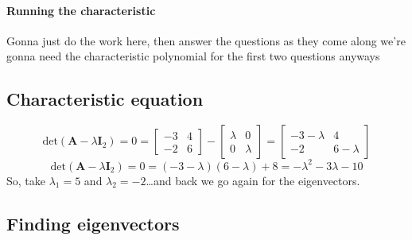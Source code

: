 \documentclass{article}
\begin{document}
        \paragraph{Running the characteristic}
            Gonna just do the work here, then answer the questions as they come along
            we're gonna need the characteristic polynomial for the first two questions anyways
        \subsection{Characteristic equation}
            \[
                \text{det}(\mathbf{A}-\lambda\mathbf{I}_2)=0
                =
                \begin{bmatrix}-3 & 4\\-2 & 6\end{bmatrix}
                -
                \begin{bmatrix}\lambda & 0\\0 & \lambda\end{bmatrix}
                =
                \begin{bmatrix}-3-\lambda & 4\\-2 & 6-\lambda\end{bmatrix}
            \]
            \[
                \text{det}(\mathbf{A}-\lambda\mathbf{I}_2)=0
                =
                (-3-\lambda)(6-\lambda)+8
                =
                -\lambda^2-3\lambda-10
            \]
            So, take $\lambda_1=5$ and $\lambda_2=-2$\dots and back we go again for the eigenvectors.
        \subsection{Finding eigenvectors}
\end{document}

